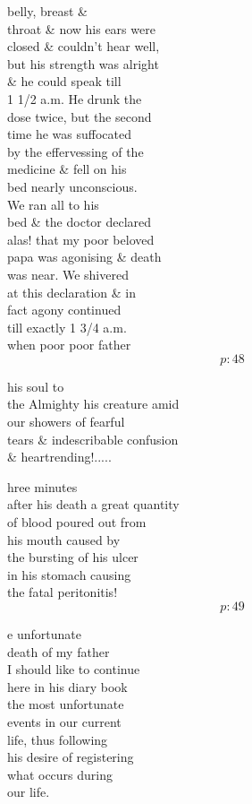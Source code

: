 \documentclass{report}
\begin{document}
	\par{
 	belly, breast \&\ \\throat \& now his ears were\ \\closed \& couldn't hear well,\ \\but his strength was alright\ \\\& he could speak till\ \\1 1/2 a.m. He drunk the\ \\dose twice, but the second\ \\time he was suffocated\ \\by the effervessing of the\ \\medicine \& fell on his\ \\bed nearly unconscious.\ \\We ran all to his\ \\bed \& the doctor declared\ \\alas! that my poor beloved\ \\papa was agonising \& death\ \\was near. We shivered\ \\at this declaration \& in\ \\fact agony continued\ \\till exactly 1 3/4 a.m.\ \\when poor poor father\ \\
  \[p: 48 \]

	}

	\par{
 	his soul to\ \\the Almighty his creature amid\ \\our showers of fearful\ \\tears \& indescribable confusion\ \\\& heartrending!.....\ \\
	}

	\par{
 	hree minutes\ \\after his death a great quantity\ \\of blood poured out from\ \\his mouth caused by\ \\the bursting of his ulcer\ \\in his stomach causing\ \\the fatal peritonitis!\ \\
  \[p: 49 \]

	}

	\par{
 	e unfortunate\ \\death of my father\ \\I should like to continue\ \\here in his diary book\ \\the most unfortunate\ \\events in our current\ \\life, thus following\ \\his desire of registering\ \\what occurs during\ \\our life.\ \\
	}
\end{document}
